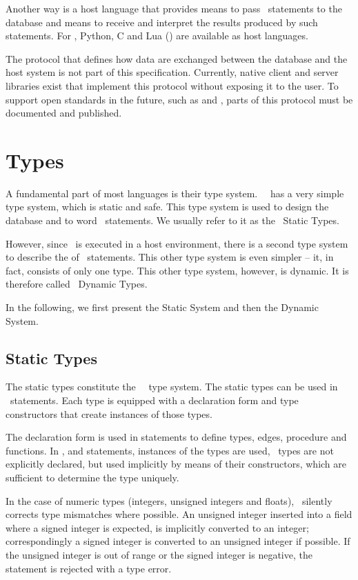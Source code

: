 Another way is a host language
that provides means to pass \sql\ statements
to the database and means to receive
and interpret the results produced by such statements.
For \nowdb, Python, C and Lua ()
are available as host languages.

The protocol that defines how data are exchanged
between the database and the host system
is not part of this specification.
Currently, native client and server libraries
exist that implement this protocol
without exposing it to the user.
To support open standards in the future, such as
 and ,
parts of this protocol must be documented
and published.

\section{Types}
A fundamental part of most languages
is their type system. \nowdb\ \sql\
has a very simple type system,
which is static and safe.
This type system is used to design
the database and to word
\sql\ statements.
We usually refer to it as the \sql\ Static Types.

However, since \sql\ is executed
in a host environment, there is a second
type system to describe the 
of \sql\ statements.
This other type system is even simpler --
it, in fact, consists of only one type.
This other type system, however, is dynamic.
It is therefore called \sql\ Dynamic Types.

In the following, we first present
the Static System and then the Dynamic System.

\subsection{Static Types}
The static types constitute the \nowdb\ \sql\ type system.
The static types can be used in \sql\ statements.
Each type is equipped with a declaration form and
type constructors that create instances of those types.

The declaration form is used in  statements
to define types, edges, procedure and functions.
In ,  and  statements,
instances of the types are used, \ie\
types are not explicitly declared, but used implicitly
by means of their constructors, which are sufficient
to determine the type uniquely.

In the case of numeric types
(integers, unsigned integers and floats),
\nowdb\ silently corrects type mismatches where possible.
An unsigned integer inserted into a field where
a signed integer is expected, is implicitly converted
to an integer; correspondingly a signed integer
is converted to an unsigned integer if possible.
If the unsigned integer is out of range or
the signed integer is negative, the statement
is rejected with a type error.

